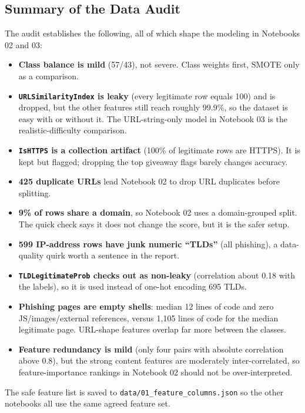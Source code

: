 \documentclass[stu,12pt,floatsintext]{apa7}
\newcommand{\code}[1]{\texttt{#1}}
\begin{document}
\subsection{Summary of the Data Audit}

The audit establishes the following, all of which shape the modeling in
Notebooks 02 and 03:

\begin{itemize}
  \item \textbf{Class balance is mild} (57/43), not severe. Class weights
    first, SMOTE only as a comparison.
  \item \textbf{\code{URLSimilarityIndex} is leaky} (every legitimate row
    equals 100) and is dropped, but the other features still reach roughly
    99.9\%, so the dataset is easy with or without it. The URL-string-only
    model in Notebook 03 is the realistic-difficulty comparison.
  \item \textbf{\code{IsHTTPS} is a collection artifact} (100\% of
    legitimate rows are HTTPS). It is kept but flagged; dropping the top
    giveaway flags barely changes accuracy.
  \item \textbf{425 duplicate URLs} lead Notebook 02 to drop URL
    duplicates before splitting.
  \item \textbf{9\% of rows share a domain}, so Notebook 02 uses a
    domain-grouped split. The quick check says it does not change the
    score, but it is the safer setup.
  \item \textbf{599 IP-address rows have junk numeric ``TLDs''} (all
    phishing), a data-quality quirk worth a sentence in the report.
  \item \textbf{\code{TLDLegitimateProb} checks out as non-leaky}
    (correlation about 0.18 with the labels), so it is used instead of
    one-hot encoding 695 TLDs.
  \item \textbf{Phishing pages are empty shells}: median 12 lines of code
    and zero JS/images/external references, versus 1{,}105 lines of code
    for the median legitimate page. URL-shape features overlap far more
    between the classes.
  \item \textbf{Feature redundancy is mild} (only four pairs with absolute
    correlation above 0.8), but the strong content features are moderately
    inter-correlated, so feature-importance rankings in Notebook 02 should
    not be over-interpreted.
\end{itemize}

The safe feature list is saved to \code{data/01\_feature\_columns.json} so
the other notebooks all use the same agreed feature set.
\end{document}
